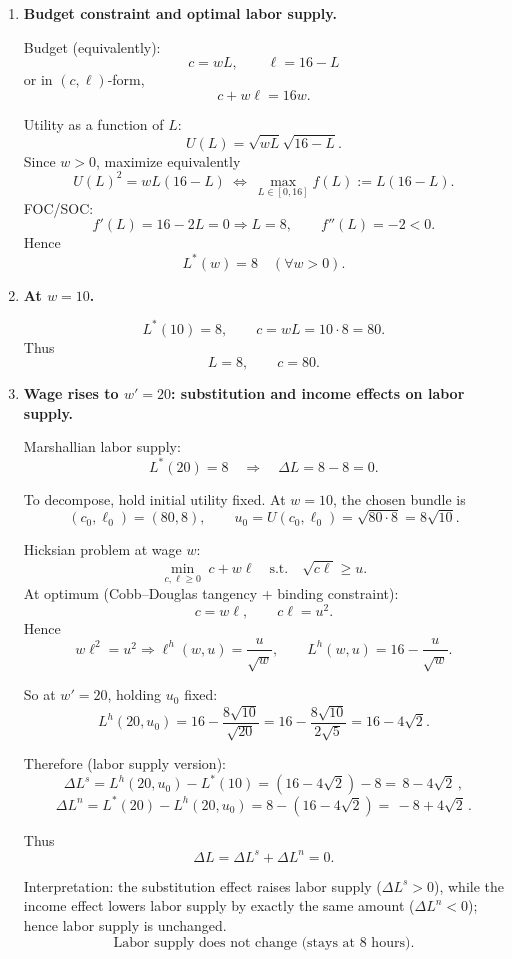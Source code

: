 \documentclass[12pt]{article}
\begin{document}
\begin{enumerate}[label=(\alph*)]
\item \textbf{Budget constraint and optimal labor supply.}

Budget (equivalently):
\[
c=wL,\qquad \ell=16-L
\]
or in \((c,\ell)\)-form,
\[
\boxed{c+w\ell=16w.}
\]

Utility as a function of \(L\):
\[
U(L)=\sqrt{wL}\sqrt{16-L}.
\]
Since \(w>0\), maximize equivalently
\[
U(L)^2=wL(16-L)\ \Longleftrightarrow\ \max_{L\in[0,16]} f(L):=L(16-L).
\]
FOC/SOC:
\[
f'(L)=16-2L=0 \Rightarrow L=8,\qquad f''(L)=-2<0.
\]
Hence
\[
\boxed{L^*(w)=8\quad(\forall w>0).}
\]

\item \textbf{At \(w=10\).}

\[
L^*(10)=8,\qquad c= wL = 10\cdot 8=80.
\]
Thus
\[
\boxed{L=8,\qquad c=80.}
\]

\item \textbf{Wage rises to \(w'=20\): substitution and income effects on labor supply.}

Marshallian labor supply:
\[
L^*(20)=8 \quad\Rightarrow\quad \Delta L = 8-8=0.
\]

To decompose, hold initial utility fixed. At \(w=10\), the chosen bundle is
\[
(c_0,\ell_0)=(80,8),\qquad u_0=U(c_0,\ell_0)=\sqrt{80\cdot 8}=8\sqrt{10}.
\]

Hicksian problem at wage \(w\):
\[
\min_{c,\ell\ge 0}\; c+w\ell \quad \text{s.t.}\quad \sqrt{c\ell}\ge u.
\]
At optimum (Cobb--Douglas tangency + binding constraint):
\[
c=w\ell,\qquad c\ell=u^2.
\]
Hence
\[
w\ell^2=u^2 \Rightarrow \ell^h(w,u)=\frac{u}{\sqrt w},
\qquad
L^h(w,u)=16-\frac{u}{\sqrt w}.
\]

So at \(w'=20\), holding \(u_0\) fixed:
\[
L^h(20,u_0)=16-\frac{8\sqrt{10}}{\sqrt{20}}
=16-\frac{8\sqrt{10}}{2\sqrt5}
=16-4\sqrt2.
\]

Therefore (labor supply version):
\[
\Delta L^s = L^h(20,u_0)-L^*(10)
=(16-4\sqrt2)-8
=\boxed{\,8-4\sqrt2\,},
\]
\[
\Delta L^n = L^*(20)-L^h(20,u_0)
=8-(16-4\sqrt2)
=\boxed{\,-8+4\sqrt2\,}.
\]

Thus
\[
\Delta L=\Delta L^s+\Delta L^n=0.
\]

Interpretation: the substitution effect raises labor supply (\(\Delta L^s>0\)), while the income effect lowers labor supply by exactly the same amount (\(\Delta L^n<0\)); hence labor supply is unchanged.
\[
\boxed{\text{Labor supply does not change (stays at 8 hours).}}
\]
\end{enumerate}
\end{document}
